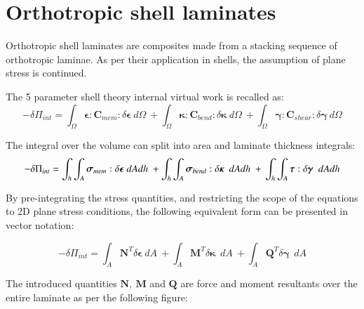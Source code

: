 \section{Orthotropic shell laminates}

Orthotropic shell laminates are composites made from a stacking sequence of orthotropic laminae. As per their application in shells, the assumption of plane stress is continued.

The 5 parameter shell theory internal virtual work is recalled as:
\begin{equation} 
-\delta\Pi_{int} =
\int_\Omega
\boldsymbol{\epsilon}
:
\mathbf{C}_{mem}
:
\delta \boldsymbol{\epsilon}\ d \Omega\ 
+
\int_\Omega
\boldsymbol{\kappa}
:
\mathbf{C}_{bend}
:
\delta \boldsymbol{\kappa}\ 
d \Omega\ 
+
\int_\Omega
\boldsymbol{\gamma}
:
\mathbf{C}_{shear}
:
\delta \boldsymbol{\gamma}\ 
d \Omega
\label{eqsrm4_in_composite1}
\end{equation}

The integral over the volume can split into area and laminate thickness integrals:
\begin{equation} 
-\delta\Pi_{int} =
\int_h
\int_A
\boldsymbol{\sigma}_{mem}
:
\delta \boldsymbol{\epsilon}\ dAdh\ 
+
\int_h
\int_A
\boldsymbol{\sigma}_{bend}
:
\delta \boldsymbol{\kappa}\ 
\ dAdh\ 
+\\
\int_h
\int_A
\boldsymbol{\tau}
:
\delta \boldsymbol{\gamma}\ 
\ dAdh
\label{eqsrm4_in_composite2}
\end{equation}

By pre-integrating the stress quantities, and restricting the scope of the equations to 2D plane stress conditions, the following equivalent form can be presented in vector notation:

\begin{equation} 
-\delta\Pi_{int} =
\int_A
\mathbf{N}^T
\delta \boldsymbol{\epsilon}
\ dA\ 
+
\int_A
\mathbf{M}^T
\delta \boldsymbol{\kappa}\ 
\ dA\ 
+
\int_A
\mathbf{Q}^T
\delta \boldsymbol{\gamma}\ 
\ dA
\label{eqsrm4_in_composite3}
\end{equation}

The introduced quantities $\mathbf{N,\ M}$ and $\mathbf{Q}$ are force and moment resultants over the entire laminate as per the following figure:

